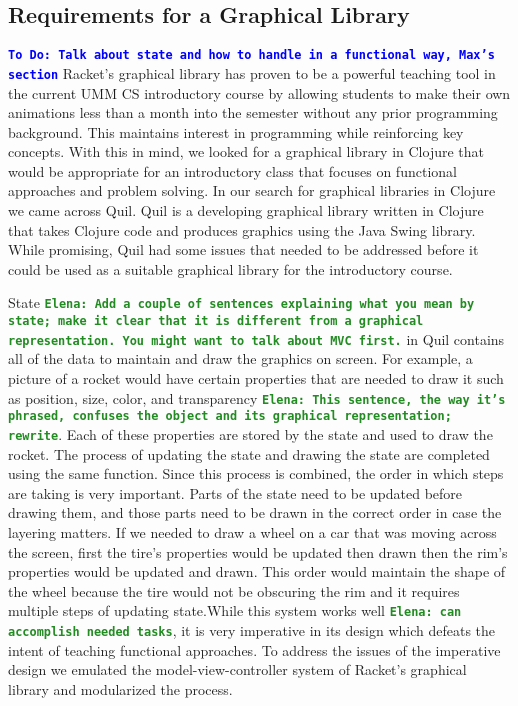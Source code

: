\documentclass[12pt]{article}
\newcommand{\comment}[1]{{\bf \tt  {#1}}}
\newcommand{\emcomment}[1]{\textcolor{ForestGreen}{\comment{Elena: {#1}}}}
\newcommand{\todo}[1]{\textcolor{blue}{\comment{To Do: {#1}}}}
\begin{document}
\subsection{Requirements for a Graphical Library}\label{subsec:requirements}
\todo{Talk about state and how to handle in a functional way, Max's section}
Racket's graphical library has proven to be a powerful teaching tool in the current UMM CS introductory course by allowing students to make their own animations less than a month into the semester without any prior programming background. This maintains interest in programming while reinforcing key concepts. With this in mind, we looked for a graphical library in Clojure that would be appropriate for an introductory class that focuses on functional approaches and problem solving. In our search for graphical libraries in Clojure we came across Quil. Quil is a developing graphical library written in Clojure that takes Clojure code and produces graphics using the Java Swing library. While promising, Quil had some issues that needed to be addressed before it could be used as a suitable graphical library for the introductory course.

State \emcomment{Add a couple of sentences explaining what you mean by state; make it clear that it is different from a graphical representation. You might want to talk about MVC first.} in Quil contains all of the data to maintain and draw the graphics on screen. For example, a picture of a rocket would have certain properties that are needed to draw it such as position, size, color, and transparency \emcomment{This sentence, the way it's phrased, confuses the object and its graphical representation; rewrite}. Each of these properties are stored by the state and used to draw the rocket. The process of updating the state and drawing the state are completed using the same function. Since this process is combined, the order in which steps are taking is very important. Parts of the state need to be updated before drawing them, and those parts need to be drawn in the correct order in case the layering matters. If we needed to draw a wheel on a car that was moving across the screen, first the tire's properties would be updated then drawn then the rim's properties would be updated and drawn. This order would maintain the shape of the wheel because the tire would not be obscuring the rim and it requires multiple steps of updating state.While this system works well \emcomment{can accomplish needed tasks}, it is very imperative in its design which defeats the intent of teaching functional approaches. To address the issues of the imperative design we emulated the model-view-controller system of Racket's graphical library and modularized the process. 
\end{document}
